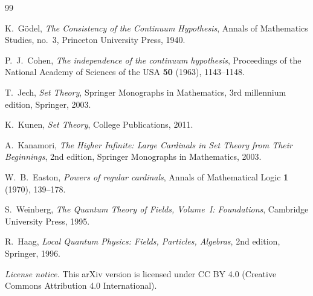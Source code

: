 \documentclass[11pt]{book}
\theoremstyle{plain}
\theoremstyle{definition}
\begin{document}
\clearpage
\begin{thebibliography}{99}
{}

K.~Gödel,
\emph{The Consistency of the Continuum Hypothesis},
Annals of Mathematics Studies, no.~3,
Princeton University Press, 1940.

P.~J.~Cohen,
\emph{The independence of the continuum hypothesis},
Proceedings of the National Academy of Sciences of the USA
\textbf{50} (1963), 1143--1148.

T.~Jech,
\emph{Set Theory},
Springer Monographs in Mathematics,
3rd millennium edition, Springer, 2003.

K.~Kunen,
\emph{Set Theory},
College Publications, 2011.

A.~Kanamori,
\emph{The Higher Infinite: Large Cardinals in Set Theory from Their Beginnings},
2nd edition, Springer Monographs in Mathematics, 2003.

W.~B.~Easton,
\emph{Powers of regular cardinals},
Annals of Mathematical Logic
\textbf{1} (1970), 139--178.

S.~Weinberg,
\emph{The Quantum Theory of Fields, Volume~I: Foundations},
Cambridge University Press, 1995.

R.~Haag,
\emph{Local Quantum Physics: Fields, Particles, Algebras},
2nd edition, Springer, 1996.

\end{thebibliography}

\bigskip
\noindent
\textit{License notice.} This arXiv version is licensed under
CC BY 4.0 (Creative Commons Attribution 4.0 International).
\end{document}
